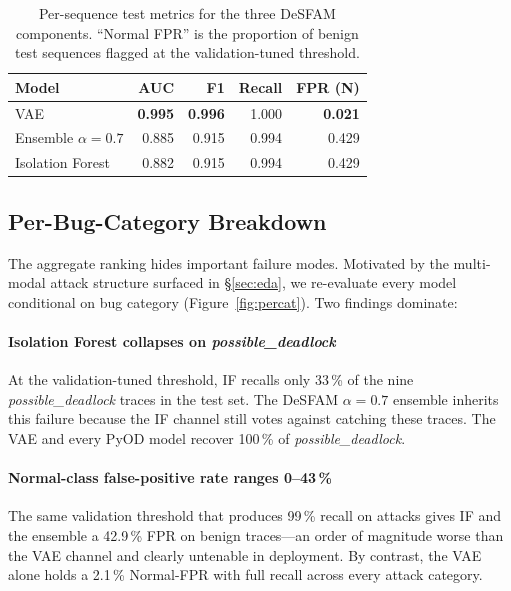 \documentclass[conference,10pt]{IEEEtran}
\begin{document}
\begin{table}[t]
\centering
\caption{Per-sequence test metrics for the three DeSFAM components.
``Normal FPR'' is the proportion of benign test sequences flagged at the
validation-tuned threshold.}
\label{tab:overall}
\begin{tabular}{lrrrr}
\toprule
\textbf{Model} & \textbf{AUC} & \textbf{F1} & \textbf{Recall} & \textbf{FPR (N)} \\
\midrule
VAE                       & \textbf{0.995} & \textbf{0.996} & 1.000 & \textbf{0.021} \\
Ensemble $\alpha\!=\!0.7$ & 0.885 & 0.915 & 0.994 & 0.429 \\
Isolation Forest          & 0.882 & 0.915 & 0.994 & 0.429 \\
\bottomrule
\end{tabular}
\end{table}

\subsection{Per-Bug-Category Breakdown}
\label{sec:percat}

The aggregate ranking hides important failure modes. Motivated by the
multi-modal attack structure surfaced in \S\ref{sec:eda}, we re-evaluate
every model conditional on bug category (Figure~\ref{fig:percat}). Two
findings dominate:

\paragraph{Isolation Forest collapses on \emph{possible\_deadlock}}
At the validation-tuned threshold, IF recalls only 33\,\% of the nine
\emph{possible\_deadlock} traces in the test set. The DeSFAM
$\alpha=0.7$ ensemble inherits this failure because the IF channel still
votes against catching these traces. The VAE and every PyOD model
recover 100\,\% of \emph{possible\_deadlock}.

\paragraph{Normal-class false-positive rate ranges 0--43\,\%}
The same validation threshold that produces 99\,\% recall on attacks
gives IF and the ensemble a 42.9\,\% FPR on benign traces---an order of
magnitude worse than the VAE channel and clearly untenable in deployment.
By contrast, the VAE alone holds a 2.1\,\% Normal-FPR with full recall
across every attack category.
\end{document}

